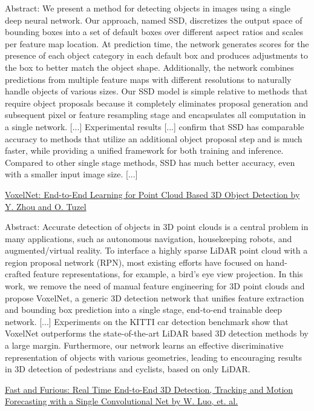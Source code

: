 \documentclass[11pt, a4paper]{article}
\begin{document}
Abstract: We present a method for detecting objects in images using a single deep neural network. Our approach, named SSD, discretizes the output space of bounding boxes into a set of default boxes over different aspect ratios and scales per feature map location. At prediction time, the network generates scores for the presence of each object category in each default box and produces adjustments to the box to better match the object shape. Additionally, the network combines predictions from multiple feature maps with different resolutions to naturally handle objects of various sizes. Our SSD model is simple relative to methods that require object proposals because it completely eliminates proposal generation and subsequent pixel or feature resampling stage and encapsulates all computation in a single network. [...] Experimental results [...] confirm that SSD has comparable accuracy to methods that utilize an additional object proposal step and is much faster, while providing a unified framework for both training and inference. Compared to other single stage methods, SSD has much better accuracy, even with a smaller input image size. [...]

\href{https://arxiv.org/abs/1711.06396}{VoxelNet: End-to-End Learning for Point Cloud Based 3D Object Detection by Y. Zhou and O. Tuzel}

Abstract: Accurate detection of objects in 3D point clouds is a central problem in many applications, such as autonomous navigation, housekeeping robots, and augmented/virtual reality. To interface a highly sparse LiDAR point cloud with a region proposal network (RPN), most existing efforts have focused on hand-crafted feature representations, for example, a bird's eye view projection. In this work, we remove the need of manual feature engineering for 3D point clouds and propose VoxelNet, a generic 3D detection network that unifies feature extraction and bounding box prediction into a single stage, end-to-end trainable deep network. [...] Experiments on the KITTI car detection benchmark show that VoxelNet outperforms the state-of-the-art LiDAR based 3D detection methods by a large margin. Furthermore, our network learns an effective discriminative representation of objects with various geometries, leading to encouraging results in 3D detection of pedestrians and cyclists, based on only LiDAR.

\href{http://openaccess.thecvf.com/content_cvpr_2018/papers/Luo_Fast_and_Furious_CVPR_2018_paper.pdf}{Fast and Furious: Real Time End-to-End 3D Detection, Tracking and Motion Forecasting with a Single Convolutional Net by W. Luo, et. al.}
\end{document}
